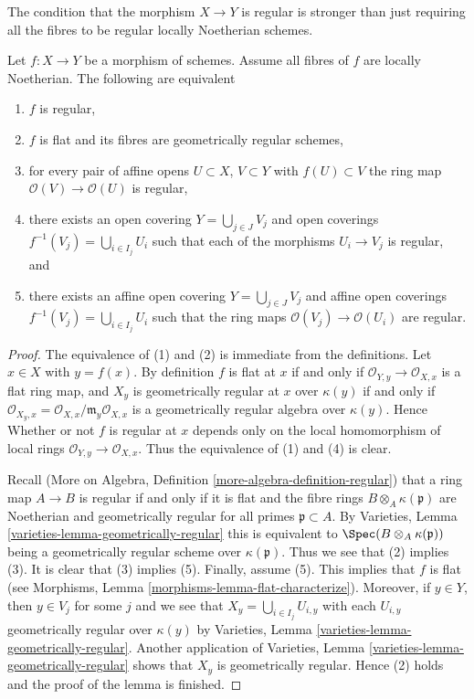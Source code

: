 \noindent
The condition that the morphism $X \to Y$ is regular
is stronger than just requiring all
the fibres to be regular locally Noetherian schemes.

\begin{lemma}
\label{lemma-regular}
Let $f : X \to Y$ be a morphism of schemes.
Assume all fibres of $f$ are locally Noetherian.
The following are equivalent
\begin{enumerate}
\item $f$ is regular,
\item $f$ is flat and its fibres are geometrically regular schemes,
\item for every pair of affine opens $U \subset X$, $V \subset Y$
with $f(U) \subset V$ the ring map $\mathcal{O}(V) \to \mathcal{O}(U)$
is regular,
\item there exists an open covering $Y = \bigcup_{j \in J} V_j$
and open coverings $f^{-1}(V_j) = \bigcup_{i \in I_j} U_i$ such
that each of the morphisms $U_i \to V_j$ is regular, and
\item there exists an affine open covering $Y = \bigcup_{j \in J} V_j$
and affine open coverings $f^{-1}(V_j) = \bigcup_{i \in I_j} U_i$ such
that the ring maps $\mathcal{O}(V_j) \to \mathcal{O}(U_i)$ are regular.
\end{enumerate}
\end{lemma}

\begin{proof}
The equivalence of (1) and (2) is immediate from the definitions.
Let $x \in X$ with $y = f(x)$. By definition $f$ is flat at $x$
if and only if $\mathcal{O}_{Y, y} \to \mathcal{O}_{X, x}$ is a
flat ring map, and $X_y$ is geometrically regular at $x$ over
$\kappa(y)$ if and only if
$\mathcal{O}_{X_y, x} = \mathcal{O}_{X, x}/\mathfrak m_y\mathcal{O}_{X, x}$
is a geometrically regular algebra over $\kappa(y)$. Hence
Whether or not $f$ is regular at $x$
depends only on the local homomorphism of local rings
$\mathcal{O}_{Y, y} \to \mathcal{O}_{X, x}$.
Thus the equivalence of (1) and (4) is clear.

\medskip\noindent
Recall (More on Algebra, Definition \ref{more-algebra-definition-regular})
that a ring map $A \to B$ is regular if and only if it is flat
and the fibre rings $B \otimes_A \kappa(\mathfrak p)$ are Noetherian
and geometrically regular for all primes $\mathfrak p \subset A$.
By Varieties, Lemma \ref{varieties-lemma-geometrically-regular}
this is equivalent to $\Spec(B \otimes_A \kappa(\mathfrak p))$
being a geometrically regular scheme over $\kappa(\mathfrak p)$.
Thus we see that (2) implies (3). It is clear that (3) implies
(5). Finally, assume (5). This implies that $f$ is flat
(see Morphisms, Lemma \ref{morphisms-lemma-flat-characterize}).
Moreover, if $y \in Y$, then $y \in V_j$ for some $j$ and we see
that $X_y = \bigcup_{i \in I_j} U_{i, y}$ with each $U_{i, y}$
geometrically regular over $\kappa(y)$ by
Varieties, Lemma \ref{varieties-lemma-geometrically-regular}.
Another application of
Varieties, Lemma \ref{varieties-lemma-geometrically-regular}
shows that $X_y$ is geometrically regular. Hence (2) holds
and the proof of the lemma is finished.
\end{proof}


